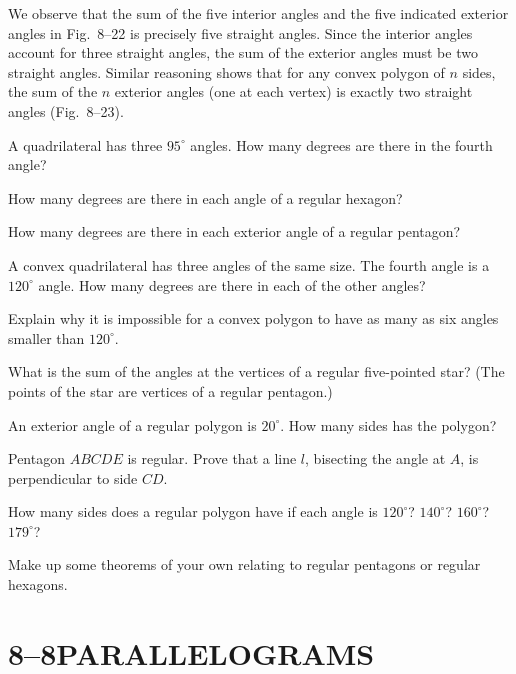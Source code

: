 \documentclass[11pt]{book}
\begin{document}
We observe that the sum of the five interior angles and the five indicated
exterior angles in Fig.~8--22 is precisely five straight angles. Since the
interior angles account for three straight angles, the sum of the exterior
angles must be two straight angles. Similar reasoning shows that for any
convex polygon of $n$ sides, the sum of the $n$ exterior angles (one at each
vertex) is exactly two straight angles (Fig.~8--23).

\begin{exercisecols}
\begin{exlist}
\item A quadrilateral has three $95^\circ$ angles. How many degrees are there
  in the fourth angle?
\item How many degrees are there in each angle of a regular hexagon?
\item How many degrees are there in each exterior angle of a regular pentagon?
\item A convex quadrilateral has three angles of the same size. The fourth
  angle is a $120^\circ$ angle. How many degrees are there in each of the
  other angles?
\item Explain why it is impossible for a convex polygon to have as many as six
  angles smaller than $120^\circ$.
\item[\stex 6.] What is the sum of the angles at the vertices of a regular
  five-pointed star? (The points of the star are vertices of a regular
  pentagon.)
\exfig{\FIGVIIITWENTYFOUR}
\item[7.] An exterior angle of a regular polygon is $20^\circ$. How many sides
  has the polygon?
\item[8.] Pentagon $ABCDE$ is regular. Prove that a line $l$, bisecting the
  angle at $A$, is perpendicular to side $CD$.
\item[9.] How many sides does a regular polygon have if each angle is
  $120^\circ$? $140^\circ$? $160^\circ$? $179^\circ$?
\item[10.] Make up some theorems of your own relating to regular pentagons or
  regular hexagons.
\end{exlist}
\end{exercisecols}

\section*{8--8\quad PARALLELOGRAMS}
\end{document}
